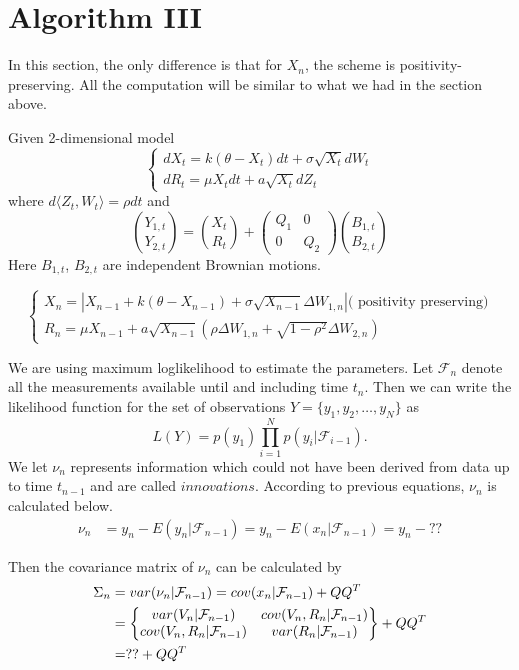 \documentclass{amsart}
\numberwithin{equation}{section}
\newcommand{\abs}[1]{\left\vert#1\right\vert}
\begin{document}
\section{Algorithm III}
In this section, the only difference is that for $X_n$, the scheme is positivity-preserving. All the computation will be similar to what we had in the section above. 


Given 2-dimensional model
$$
\begin{cases}
dX_{t}=k(\theta-X_t)dt+\sigma\sqrt{X_{t}}dW_{t}\\
dR_{t} = \mu X_{t}dt+a\sqrt{X_{t}}dZ_{t}
\end{cases}
$$
where $d\langle Z_{t},W_{t}\rangle=\rho dt$ and 
\begin{equation}
 \binom{Y_{1,t}}{Y_{2,t}} =   \binom{X_{t}}{R_{t}} + \begin{pmatrix}
   Q_{1}   & 0 \\
   0   & Q_{2} 
 \end{pmatrix} \binom{B_{1,t}}{B_{2,t}} 
\end{equation}
Here  $B_{1,t}$, $B_{2,t}$ are independent Brownian motions.
 

$$
\begin{cases}
X_{n} = \abs{X_{n-1}+ k(\theta-X_{n-1}) +\sigma \sqrt{X_{n-1}}\Delta W_{1,n}} \text{( positivity preserving)}\\
R_{n} = \mu X_{n-1}+a\sqrt{X_{n-1}}(\rho\Delta W_{1,n}+\sqrt{1-\rho^2}\Delta W_{2,n})
\end{cases}
$$

  

We are using maximum loglikelihood to estimate the parameters. Let $\mathcal F_{n}$ denote all the measurements available until and including time $t_{n}$. Then we can write the likelihood function for the set of observations $Y =\{y_{1},y_{2},\dots, y_{N}\}$ as 
$$
L(Y) = p(y_{1})\prod_{i=1}^{N}p(y_{i}|\mathcal F_{i-1}).
$$
We let $\nu_{n}$ represents information which could not have been derived from data up to time $t_{n-1}$ and are called $\textit{innovations}$. According to previous equations, $\nu_{n}$ is calculated below.
%
\begin{align}
\nu_{n}&=y_{n}-E(y_{n}|\mathcal F_{n-1}) 
 =y_{n}-E(x_{n}|\mathcal F_{n-1})  
 =y_{n}- ?? 
\end{align}
 


Then the covariance matrix of $\nu_{n}$ can be calculated by
%
\begin{align}
\Sigma_{n}&=var(\nu_{n}|\mathcal F_{n-1}) 
 =cov(x_{n}|\mathcal F_{n-1})+QQ^{T}    \\
&=\left\{
\begin{matrix}
var(V_{n}|\mathcal F_{n-1}) & cov(V_{n},R_{n}|\mathcal F_{n-1})\\
cov(V_{n},R_{n}|\mathcal F_{n-1}) & var(R_{n}|\mathcal F_{n-1})
\end{matrix}
\right\}+QQ^{T} \notag \\
&= ??+QQ^{T} \notag
\end{align}
 
\end{document}
